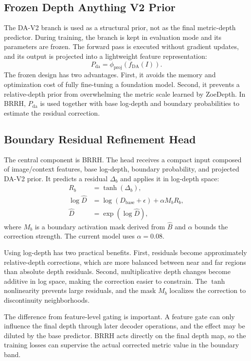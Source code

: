 \documentclass{ieeeaccess}
\begin{document}
\subsection{Frozen Depth Anything V2 Prior}

The DA-V2 branch is used as a structural prior, not as the final metric-depth predictor. During training, the branch is kept in evaluation mode and its parameters are frozen. The forward pass is executed without gradient updates, and its output is projected into a lightweight feature representation:
\begin{equation}
P_{\mathrm{da}}=\phi_{\mathrm{proj}}(f_{\mathrm{DA}}(I)).
\end{equation}
The frozen design has two advantages. First, it avoids the memory and optimization cost of fully fine-tuning a foundation model. Second, it prevents a relative-depth prior from overwhelming the metric scale learned by ZoeDepth. In BRRH, $P_{\mathrm{da}}$ is used together with base log-depth and boundary probabilities to estimate the residual correction.

\subsection{Boundary Residual Refinement Head}

The central component is BRRH. The head receives a compact input composed of image/context features, base log-depth, boundary probability, and projected DA-V2 prior. It predicts a residual $\Delta_b$ and applies it in log-depth space:
\begin{align}
R_b &= \tanh(\Delta_b),\\
\log \hat{D} &= \log(D_{\mathrm{base}}+\epsilon)+\alpha M_b R_b,\\
\hat{D} &= \exp(\log \hat{D}),
\label{eq:brrh}
\end{align}
where $M_b$ is a boundary activation mask derived from $\hat{B}$ and $\alpha$ bounds the correction strength. The current model uses $\alpha=0.08$.

Using log-depth has two practical benefits. First, residuals become approximately relative-depth corrections, which are more balanced between near and far regions than absolute depth residuals. Second, multiplicative depth changes become additive in log space, making the correction easier to constrain. The $\tanh$ nonlinearity prevents large residuals, and the mask $M_b$ localizes the correction to discontinuity neighborhoods.

The difference from feature-level gating is important. A feature gate can only influence the final depth through later decoder operations, and the effect may be diluted by the base predictor. BRRH acts directly on the final depth map, so the training losses can supervise the actual corrected metric value in the boundary band.
\end{document}
